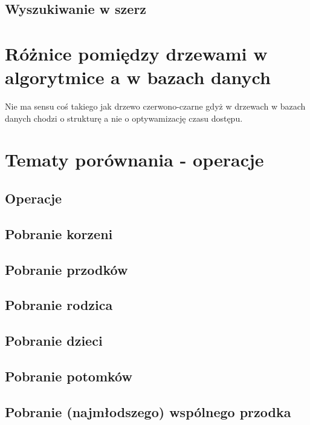 \documentclass[10pt,a4paper,oneside]{book}
\begin{document}
\subsection{Wyszukiwanie w szerz}


\section{Różnice pomiędzy drzewami w algorytmice a w bazach danych}

Nie ma sensu coś takiego jak drzewo czerwono-czarne gdyż w drzewach w bazach danych chodzi o strukturę a nie o optywamizację czasu dostępu.

\section{Tematy porównania - operacje}



\subsection{Operacje}
\subsection{Pobranie korzeni}
\subsection{Pobranie przodków}
\subsection{Pobranie rodzica}
\subsection{Pobranie dzieci}
\subsection{Pobranie potomków}
\subsection{Pobranie (najmłodszego) wspólnego przodka}



\end{document}
